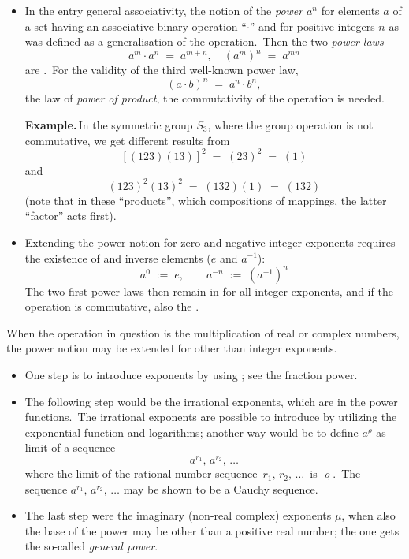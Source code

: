 \documentclass[12pt]{article}
\theoremstyle{definition}
\begin{document}

\begin{itemize}
\item In the entry general associativity, the notion of the \emph{power} $a^n$ for elements $a$ of a set having an associative binary operation ``$\cdot$'' and for positive integers $n$ as  was defined as a generalisation of the operation.\, Then the two \emph{power laws}
$$a^m\!\cdot\!a^n \;=\; a^{m+n}, \quad (a^m)^n \;=\; a^{mn}$$
are .\, For the validity of the third well-known power law, 
$$(a\!\cdot\!b)^n \;=\; a^n\!\cdot\!b^n,$$
the law of \emph{power of product}, the commutativity of the operation is needed.

\textbf{Example.}\,In the symmetric group $S_3$, where the group operation is not commutative, we get different results from
$$[(123)(13)]^2 \;=\; (23)^2 \;=\; (1)$$ 
and
$$(123)^2(13)^2 \;=\; (132)(1) \;=\; (132)$$
(note that in these ``products'', which  compositions of mappings, the latter ``factor'' acts first).
\end{itemize}


\begin{itemize}
\item Extending the power notion for zero and negative integer exponents requires the existence of  and inverse elements ($e$ and $a^{-1}$):
$$a^0 \;:=\; e, \qquad a^{-n} \;:=\; (a^{-1})^n$$
The two first power laws then remain in  for all integer exponents, and if the operation is commutative, also the .
\end{itemize}

When the operation in question is the multiplication of real or complex numbers, the power notion may be extended for other than integer exponents.

\begin{itemize}
\item One step is to introduce  exponents by using ; see the fraction power.
\item The following step would be the irrational exponents, which are  in the power functions.\, The irrational exponents are possible to introduce by utilizing the exponential function and logarithms; another way would be to define $a^\varrho$ as limit of a sequence 
$$a^{r_1},\,a^{r_2},\,\ldots$$
where the limit of the rational number sequence \,$r_1,\,r_2,\,\ldots$\, is $\varrho$.\, The sequence 
$a^{r_1},\,a^{r_2},\,\ldots$ may be shown to be a Cauchy sequence.
\item The last step were the imaginary (non-real complex) exponents $\mu$, when also the base of the power may be other than a positive real number; the one gets the so-called \emph{general power}.
\end{itemize}

\end{document}
